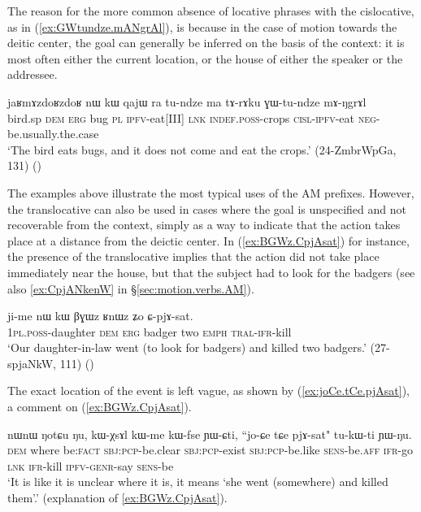 The reason for the more common absence of locative phrases with the cislocative, as in (\ref{ex:GWtundze.mANgrAl}), is because in the case of motion towards the deitic center, the goal can generally be inferred on the basis of the context: it is most often either the current location, or the house of either the speaker or the addressee.

\begin{exe}
\ex \label{ex:GWtundze.mANgrAl}
\gll  jaʁmɤzdoʁzdoʁ nɯ kɯ qajɯ ra tu-ndze ma tɤ-rɤku ɣɯ-tu-ndze mɤ-ŋgrɤl \\
bird.sp \textsc{dem} \textsc{erg} bug \textsc{pl} \textsc{ipfv}-eat[III] \textsc{lnk} \textsc{indef}.\textsc{poss}-crops \textsc{cisl}-\textsc{ipfv}-eat \textsc{neg}-be.usually.the.case \\
\glt `The bird  eats bugs, and it does not come and eat the crops.' (24-ZmbrWpGa, 131)
()
\end{exe}

The examples above illustrate the most typical uses of the AM prefixes. However, the translocative can also be used in cases where the goal is unspecified and not recoverable from the context, simply as a way to indicate that the action takes place at a distance from the deictic center. In (\ref{ex:BGWz.CpjAsat}) for instance, the presence of the translocative implies that the action did not take place immediately near the house, but that the subject had to look for the badgers (see also \ref{ex:CpjANkenW} in §\ref{sec:motion.verbs.AM}).

\begin{exe}
\ex  \label{ex:BGWz.CpjAsat}
 \gll  ji-me nɯ kɯ βɣɯz ʁnɯz ʑo ɕ-pjɤ-sat. \\
\textsc{1pl}.\textsc{poss}-daughter \textsc{dem} \textsc{erg} badger two \textsc{emph} \textsc{tral}-\textsc{ifr}-kill \\
\glt `Our daughter-in-law went (to look for badgers) and killed two badgers.' (27-spjaNkW, 111)
()
\end{exe}

The exact location of the event is left vague, as shown by  (\ref{ex:joCe.tCe.pjAsat}), a comment on (\ref{ex:BGWz.CpjAsat}).

\begin{exe}
\ex  \label{ex:joCe.tCe.pjAsat}
 \gll  nɯnɯ ŋotɕu ŋu, kɯ-χsɤl kɯ-me kɯ-fse ɲɯ-ɕti, ``jo-ɕe tɕe pjɤ-sat" tu-kɯ-ti ɲɯ-ŋu. \\
 \textsc{dem} where be:\textsc{fact} \textsc{sbj}:\textsc{pcp}-be.clear \textsc{sbj}:\textsc{pcp}-exist   \textsc{sbj}:\textsc{pcp}-be.like \textsc{sens}-be.\textsc{aff} \textsc{ifr}-go \textsc{lnk} \textsc{ifr}-kill \textsc{ipfv}-\textsc{genr}-say \textsc{sens}-be \\
 \glt `It is like it is unclear where it is, it means `she went (somewhere) and killed them'.' (explanation of \ref{ex:BGWz.CpjAsat}).
\end{exe}

